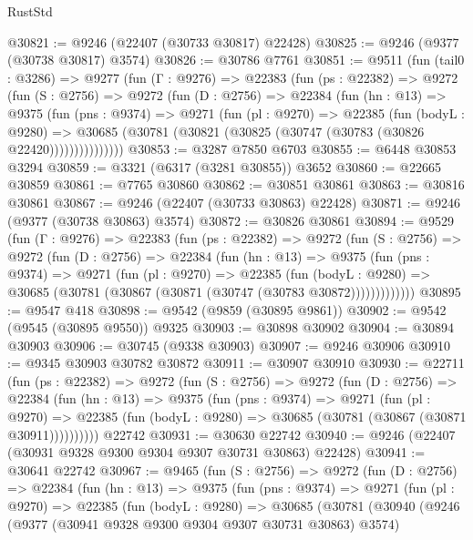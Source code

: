 \begin{lexlean}{RustStd}
\begin{coremodule}
@30821 := @9246 (@22407 (@30733 @30817) @22428)
@30825 := @9246 (@9377 (@30738 @30817) @3574)
@30826 := @30786 @7761
@30851 := @9511
    (fun (tail0 : @3286) =>
    @9277
      (fun (Γ : @9276) =>
      @22383
        (fun (ps : @22382) =>
        @9272
          (fun (S : @2756) =>
          @9272
            (fun (D : @2756) =>
            @22384
              (fun (hn : @13) =>
              @9375
                (fun (pns : @9374) =>
                @9271
                  (fun (pl : @9270) =>
                  @22385
                    (fun (bodyL : @9280) =>
                    @30685 (@30781 (@30821 (@30825 (@30747 (@30783 (@30826 @22420)))))))))))))))
@30853 := @3287 @7850 @6703
@30855 := @6448 @30853 @3294
@30859 := @3321 (@6317 (@3281 @30855)) @3652
@30860 := @22665 @30859
@30861 := @7765 @30860
@30862 := @30851 @30861
@30863 := @30816 @30861
@30867 := @9246 (@22407 (@30733 @30863) @22428)
@30871 := @9246 (@9377 (@30738 @30863) @3574)
@30872 := @30826 @30861
@30894 := @9529
    (fun (Γ : @9276) =>
    @22383
      (fun (ps : @22382) =>
      @9272
        (fun (S : @2756) =>
        @9272
          (fun (D : @2756) =>
          @22384
            (fun (hn : @13) =>
            @9375
              (fun (pns : @9374) =>
              @9271
                (fun (pl : @9270) =>
                @22385
                  (fun (bodyL : @9280) =>
                  @30685 (@30781 (@30867 (@30871 (@30747 (@30783 @30872)))))))))))))
@30895 := @9547 @418
@30898 := @9542 (@9859 (@30895 @9861))
@30902 := @9542 (@9545 (@30895 @9550)) @9325
@30903 := @30898 @30902
@30904 := @30894 @30903
@30906 := @30745 (@9338 @30903)
@30907 := @9246 @30906
@30910 := @9345 @30903 @30782 @30872
@30911 := @30907 @30910
@30930 := @22711
    (fun (ps : @22382) =>
    @9272
      (fun (S : @2756) =>
      @9272
        (fun (D : @2756) =>
        @22384
          (fun (hn : @13) =>
          @9375
            (fun (pns : @9374) =>
            @9271
              (fun (pl : @9270) =>
              @22385 (fun (bodyL : @9280) => @30685 (@30781 (@30867 (@30871 @30911))))))))))
    @22742
@30931 := @30630 @22742
@30940 := @9246 (@22407 (@30931 @9328 @9300 @9304 @9307 @30731 @30863) @22428)
@30941 := @30641 @22742
@30967 := @9465
    (fun (S : @2756) =>
    @9272
      (fun (D : @2756) =>
      @22384
        (fun (hn : @13) =>
        @9375
          (fun (pns : @9374) =>
          @9271
            (fun (pl : @9270) =>
            @22385
              (fun (bodyL : @9280) =>
              @30685
                (@30781
                  (@30940
                    (@9246
                      (@9377 (@30941 @9328 @9300 @9304 @9307 @30731 @30863) @3574)

\end{coremodule}
\end{lexlean}
